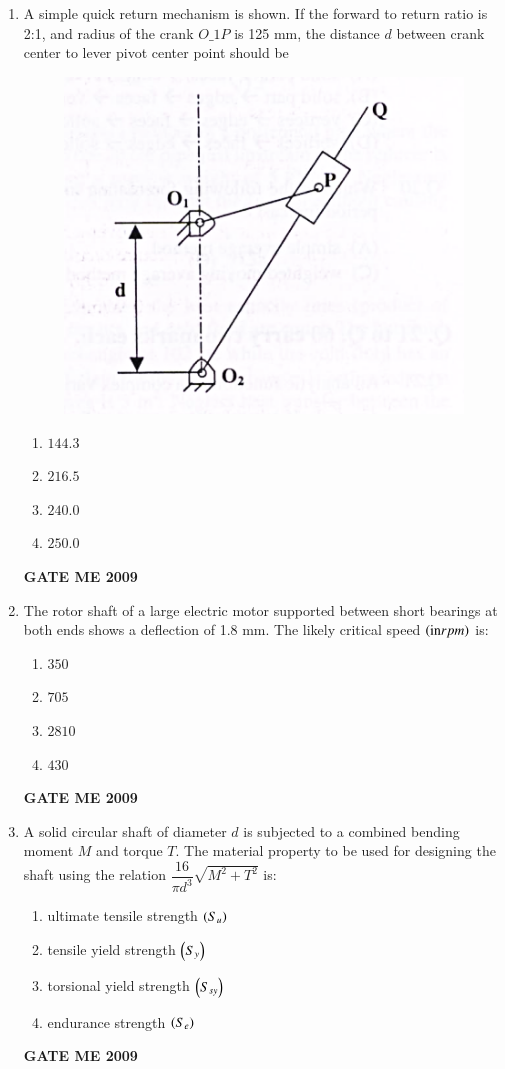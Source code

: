 \documentclass[journal]{IEEEtran}
\begin{document}
\begin{enumerate}[leftmargin=0pt]
\item A simple quick return mechanism is shown. If the forward to return ratio is 2:1, and radius of the crank $O\_1P$ is 125 mm, the distance $d$  between crank center to lever pivot center point should be
    \begin{figure}[h]
      \centering
      \includegraphics[width=0.3\linewidth]{Figs/image (3).png}
      \caption{}
    \end{figure}
    
  \begin{enumerate}[label=(\alph*)]
    \item $144.3$
    \item $216.5$
    \item $240.0$
    \item $250.0$
  \end{enumerate}
  \hfill{\textbf{GATE ME 2009}}


\item The rotor shaft of a large electric motor supported between short bearings at both ends shows a deflection of 1.8 mm. The likely critical speed $\left(\text{in} rpm\right)$ is:
  \begin{enumerate}[label=(\alph*)]
    \item $350$
    \item $705$
    \item $2810$
    \item $430$
  \end{enumerate}
  \hfill{\textbf{GATE ME 2009}}

\item A solid circular shaft of diameter $d$ is subjected to a combined bending moment $M$ and torque $T$. The material property to be used for designing the shaft using the relation $\dfrac{16}{\pi d^{3}} \sqrt{M^{2} + T^{2}}$ is:
  \begin{enumerate}[label=(\alph*)]
    \item ultimate tensile strength $\left(S_u\right)$
    \item tensile yield strength $\left(S_y\right)$
    \item torsional yield strength $\left(S_{sy}\right)$
    \item endurance strength $\left(S_e\right)$
  \end{enumerate}
  \hfill{\textbf{GATE ME 2009}}


\end{enumerate}
\end{document}
